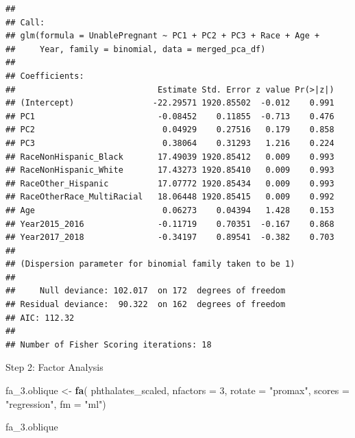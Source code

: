 \documentclass[
]{article}
\newenvironment{Shaded}{\begin{snugshade}}{\end{snugshade}}
\newcommand{\AttributeTok}[1]{\textcolor[rgb]{0.13,0.29,0.53}{#1}}
\newcommand{\DecValTok}[1]{\textcolor[rgb]{0.00,0.00,0.81}{#1}}
\newcommand{\FunctionTok}[1]{\textcolor[rgb]{0.13,0.29,0.53}{\textbf{#1}}}
\newcommand{\NormalTok}[1]{#1}
\newcommand{\OtherTok}[1]{\textcolor[rgb]{0.56,0.35,0.01}{#1}}
\newcommand{\StringTok}[1]{\textcolor[rgb]{0.31,0.60,0.02}{#1}}
\begin{document}
\begin{verbatim}
## 
## Call:
## glm(formula = UnablePregnant ~ PC1 + PC2 + PC3 + Race + Age + 
##     Year, family = binomial, data = merged_pca_df)
## 
## Coefficients:
##                             Estimate Std. Error z value Pr(>|z|)
## (Intercept)                -22.29571 1920.85502  -0.012    0.991
## PC1                         -0.08452    0.11855  -0.713    0.476
## PC2                          0.04929    0.27516   0.179    0.858
## PC3                          0.38064    0.31293   1.216    0.224
## RaceNonHispanic_Black       17.49039 1920.85412   0.009    0.993
## RaceNonHispanic_White       17.43273 1920.85410   0.009    0.993
## RaceOther_Hispanic          17.07772 1920.85434   0.009    0.993
## RaceOtherRace_MultiRacial   18.06448 1920.85415   0.009    0.992
## Age                          0.06273    0.04394   1.428    0.153
## Year2015_2016               -0.11719    0.70351  -0.167    0.868
## Year2017_2018               -0.34197    0.89541  -0.382    0.703
## 
## (Dispersion parameter for binomial family taken to be 1)
## 
##     Null deviance: 102.017  on 172  degrees of freedom
## Residual deviance:  90.322  on 162  degrees of freedom
## AIC: 112.32
## 
## Number of Fisher Scoring iterations: 18
\end{verbatim}

Step 2: Factor Analysis

\begin{Shaded}
\begin{Highlighting}[]
\NormalTok{fa\_3.oblique }\OtherTok{\textless{}{-}} \FunctionTok{fa}\NormalTok{(}
\NormalTok{  phthalates\_scaled,}
  \AttributeTok{nfactors =} \DecValTok{3}\NormalTok{,}
  \AttributeTok{rotate =} \StringTok{"promax"}\NormalTok{,}
  \AttributeTok{scores =} \StringTok{"regression"}\NormalTok{,}
  \AttributeTok{fm =} \StringTok{"ml"}\NormalTok{)}

\NormalTok{fa\_3.oblique}
\end{Highlighting}
\end{Shaded}
\end{document}
